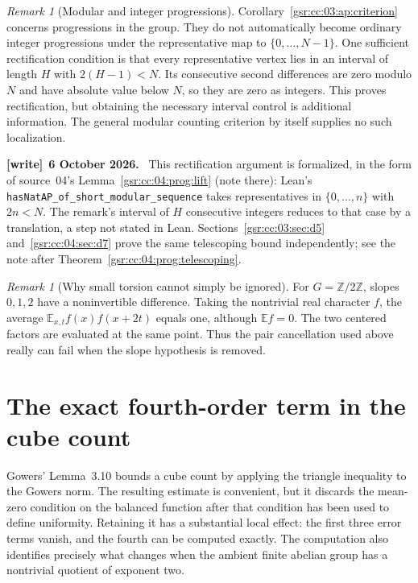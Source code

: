 \documentclass[11pt,letterpaper]{article}
\numberwithin{equation}{section}
\theoremstyle{definition}
\theoremstyle{remark}
\newtheorem{remark}[theorem]{Remark}
\newcommand{\E}{\mathbb E}
\newcommand{\Z}{\mathbb Z}
\newcommand{\1}{\mathbf 1}
\newcommand{\file}[1]{\nolinkurl{#1}}
\newenvironment{writenote}[1][]{\par\smallskip\begingroup\small
 \noindent\textbf{[write]}\if\relax\detokenize{#1}\relax\else~\textbf{#1.}\fi\ }%
 {\par\endgroup\smallskip}
\newcommand{\srctag}[1]{\texorpdfstring{\enspace\textup{[#1]}}{ [#1]}}
\newcommand{\srcnote}[2]{\par\noindent{\small\textit{Source #1, delivered #2.}}\par}
\begin{document}
\begin{remark}[Modular and integer progressions]\label{gsr:cc:03:rem:rectify}
Corollary~\ref{gsr:cc:03:ap:criterion} concerns progressions in the group.
They do not automatically become ordinary integer progressions under
the representative map to $\{0,\ldots,N-1\}$. One sufficient
rectification condition is that every representative vertex lies in an
interval of length $H$ with $2(H-1)<N$. Its consecutive second
differences are zero modulo $N$ and have absolute value below $N$,
so they are zero as integers. This proves rectification, but obtaining
the necessary interval control is additional information. The general
modular counting criterion by itself supplies no such localization.
\end{remark}
\begin{writenote}[6 October 2026]
This rectification argument is formalized, in the form of source~04's Lemma~\ref{gsr:cc:04:prog:lift} (note there): Lean's \file{hasNatAP_of_short_modular_sequence} takes representatives in $\{0,\ldots,n\}$ with $2n<N$. The remark's interval of $H$ consecutive integers reduces to that case by a translation, a step not stated in Lean. Sections~\ref{gsr:cc:03:sec:d5} and~\ref{gsr:cc:04:sec:d7} prove the same telescoping bound independently; see the note after Theorem~\ref{gsr:cc:04:prog:telescoping}.
\end{writenote}

\begin{remark}[Why small torsion cannot simply be ignored]
For $G=\Z/2\Z$, slopes $0,1,2$ have a noninvertible difference.
Taking the nontrivial real character $f$, the average
$\E_{x,t}f(x)f(x+2t)$ equals one, although $\E f=0$.
The two centered factors are evaluated at the same point. Thus the
pair cancellation used above really can fail when the slope hypothesis
is removed.
\end{remark}

\section[{The exact fourth-order term in the cube count\srctag{03}}]{The exact fourth-order term in the cube count}\label{gsr:cc:03:sec:d6}
\srcnote{03}{Section 6}
\label{gsr:cc:03:cube:section}

Gowers' Lemma~3.10 bounds a cube count by applying the triangle inequality
to the Gowers norm.  The resulting estimate is convenient, but it discards
the mean-zero condition on the balanced function after that condition has
been used to define uniformity.  Retaining it has a substantial local
effect: the first three error terms vanish, and the fourth can be computed
exactly.  The computation also identifies precisely what changes when the
ambient finite abelian group has a nontrivial quotient of exponent two.
\end{document}
